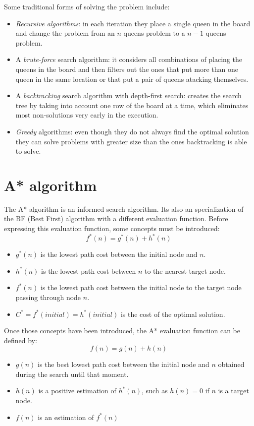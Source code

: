 \documentclass[11pt]{llncs}
\begin{document}
Some traditional forms of solving the problem include:
\begin{itemize}
    \item \textit{Recursive algorithms}: in each iteration they place a single queen in the board and change the problem from an $n$ queens problem to a $n - 1$ queens problem.
    \item A \textit{brute-force} search algorithm: it considers all combinations of placing the queens in the board and then filters out the ones that put more than one queen in the same location or that put a pair of queens atacking themselves.
    \item A \textit{backtracking} search algorithm with depth-first search: creates the search tree by taking into account one row of the board at a time, which eliminates most non-solutions very early in the execution.
    \item \textit{Greedy} algorithms: even though they do not always find the optimal solution they can solve problems with greater size than the ones backtracking is able to solve.
\end{itemize}
\section{A* algorithm}\label{astar_alg}
The A* algorithm \cite{inteligencia_artificial,artificial_intelligence} is an informed search algorithm. Its also an specialization of the BF (Best First) algorithm with a different evaluation function. Before expressing this evaluation function, some concepts must be introduced:
\[f^{*}(n) = g^{*}(n) + h^{*}(n)\]
\begin{itemize}
    \item $g^{*}(n)$ is the lowest path cost between the initial node and $n$.
    \item $h^{*}(n)$ is the lowest path cost between $n$ to the nearest target node.
    \item $f^{*}(n)$ is the lowest path cost between the initial node to the target node passing through node $n$. 
    \item $C^{*} = f^{*}(initial) = h^{*}(initial)$ is the cost of the optimal solution. 
\end{itemize}

Once those concepts have been introduced, the A* evaluation function can be defined by:
\[f(n) = g(n) + h(n)\]
\begin{itemize}
    \item $g(n)$ is the best lowest path cost between the initial node and $n$ obtained during the search until that moment.
    \item $h(n)$ is a positive estimation of $h^{*}(n)$, such as $h(n) = 0$ if $n$ is a target node.
    \item $f(n)$ is an estimation of $f^{*}(n)$
\end{itemize}
\end{document}
